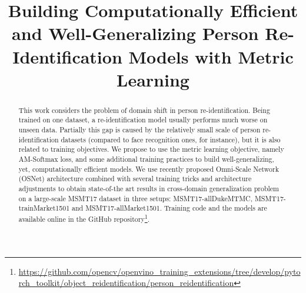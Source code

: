 \documentclass[a4paper,conference]{IEEEtran}
\begin{document}
\title{Building Computationally Efficient and Well-Generalizing Person Re-Identification Models with Metric Learning}


\author{
\and
{}
}













\maketitle

\begin{abstract}
  This work considers the problem of domain shift in person re-identification.
  Being trained on one dataset, a re-identification model usually performs much
  worse on unseen data. Partially this gap is caused by the relatively small
  scale of person re-identification datasets (compared to face recognition ones,
  for instance), but it is also related to training objectives. We propose to
  use the metric learning objective, namely AM-Softmax loss, and some additional
  training practices to build well-generalizing, yet, computationally efficient
  models. We use recently proposed Omni-Scale Network (OSNet) architecture
  combined with several training tricks and architecture adjustments to obtain
  state-of-the art results in cross-domain generalization problem on a
  large-scale MSMT17 dataset in three setups: MSMT17-allDukeMTMC,
  MSMT17-trainMarket1501 and MSMT17-allMarket1501. Training code
  and the models are available online in the GitHub repository\footnote{
    \url{https://github.com/opencv/openvino_training_extensions/tree/develop/pytorch_toolkit/object_reidentification/person_reidentification}}.

\end{abstract}






\IEEEpeerreviewmaketitle
\end{document}
